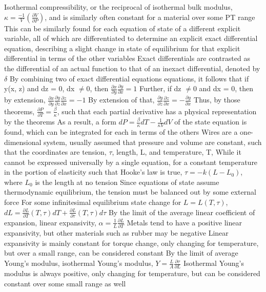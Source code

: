 \documentclass[11 pt, twoside]{article}
\newenvironment{outline*}
{
	\begin{outline}[enumerate]
	}
	{\end{outline}
}
\begin{document}
\begin{outline*}
\4 Isothermal compressibility, or the reciprocal of isothermal bulk modulus, $\kappa = \frac{-1}{V}(\frac{\partial V}{\partial P})$, and is similarly often constant for a material over some PT range
\2 This can be similarly found for each equation of state of a different explicit variable, all of which are differentiated to determine an explicit exact differential equation, describing a slight change in state of equilibrium for that explicit differential in terms of the other variables
\3 Exact differentials are contrasted as the differential of an actual function to that of an inexact differential, denoted by $\delta$
\3 By combining two of exact differential equations equations, it follows that if y(x, z) and dz = 0, dx $\neq 0$, then $\frac{\partial x}{\partial y}\frac{\partial y}{\partial x} = 1$
\4 Further, if dz $\neq 0$ and dx = 0, then by extension, $\frac{\partial x}{\partial y}\frac{\partial y}{\partial z}\frac{\partial z}{\partial x} = -1$
\4 By extension of that, $\frac{\partial y}{\partial z}\frac{\partial z}{\partial x} = -\frac{\partial y}{\partial x}$
\3 Thus, by those theorems, $\frac{\partial P}{\partial T} = \frac{\beta}{\kappa}$, such that each partial derivative has a physical representation by the theorems
\4 As a result, a form $dP = \frac{\beta}{\kappa}dT - \frac{1}{\kappa V}dV$ of the state equation is found, which can be integrated for each in terms of the others
\1 Wires are a one-dimensional system, usually assumed that pressure and volume are constant, such that the coordinates are tension, $\tau$, length, L, and temperature, T,
\2 While it cannot be expressed universally by a single equation, for a constant temperature in the portion of elasticity such that Hooke's law is true, $\tau = -k(L - L_0)$, where $L_0$ is the length at no tension
\3 Since equations of state assume thermodynamic equilibrium, the tension must be balanced out by some external force
\2 For some infinitesimal equilibrium state change for $L = L(T, \tau)$, $dL = \frac{\partial L}{\partial T}(T, \tau)dT + \frac{\partial L}{\partial \tau}(T, \tau)d\tau$
\3 By the limit of the average linear coefficient of expansion, linear expansivity, $\alpha = \frac{1}{L}\frac{\partial L}{\partial T}$
\4 Metals tend to have a positive linear expansivity, but other materials such as rubber may be negative
\4 Linear expansivity is mainly constant for torque change, only changing for temperature, but over a small range, can be considered constant
\3 By the limit of average Young's modulus, isothermal Young's modulus, $Y = \frac{L}{A}\frac{\partial \tau}{\partial L}$
\4 Isothermal Young's modulus is always positive, only changing for temperature, but can be considered constant over some small range as well

\end{outline*}
\end{document}
